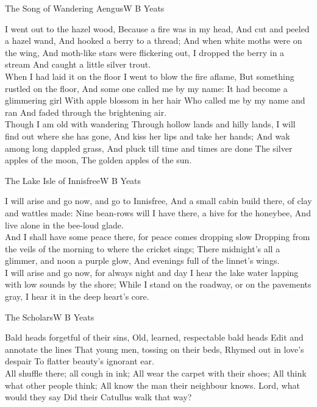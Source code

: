 \begin{poem}{The Song of Wandering Aengus}{W B Yeats}

I went out to the hazel wood, 
Because a fire was in my head, 
And cut and peeled a hazel wand, 
And hooked a berry to a thread; 
And when white moths were on the wing, 
And moth-like stars were flickering out, 
I dropped the berry in a stream 
And caught a little silver trout.\\

When I had laid it on the floor 
I went to blow the fire aflame, 
But something rustled on the floor, 
And some one called me by my name: 
It had become a glimmering girl 
With apple blossom in her hair 
Who called me by my name and ran 
And faded through the brightening air.\\

Though I am old with wandering 
Through hollow lands and hilly lands, 
I will find out where she has gone, 
And kiss her lips and take her hands; 
And wak among long dappled grass, 
And pluck till time and times are done 
The silver apples of the moon, 
The golden apples of the sun. \\
\end{poem}

 

\begin{poem}{The Lake Isle of Innisfree}{W B Yeats}

I will arise and go now, and go to Innisfree, 
And a small cabin build there, of clay and wattles made: 
Nine bean-rows will I have there, a hive for the honeybee, 
And live alone in the bee-loud glade. \\

And I shall have some peace there, for peace comes dropping slow 
Dropping from the veils of the morning to where the cricket sings; 
There midnight's all a glimmer, and noon a purple glow, 
And evenings full of the linnet's wings. \\

I will arise and go now, for always night and day 
I hear the lake water lapping with low sounds by the shore; 
While I stand on the roadway, or on the pavements gray, 
I hear it in the deep heart's core. \\
\end{poem}

 

\begin{poem}{The Scholars}{W B Yeats}

Bald heads forgetful of their sins,
Old, learned, respectable bald heads
Edit and annotate the lines
That young men, tossing on their beds,
Rhymed out in love's despair
To flatter beauty's ignorant ear.\\

All shuffle there; all cough in ink;
All wear the carpet with their shoes;
All think what other people think;
All know the man their neighbour knows.
Lord, what would they say
Did their Catullus walk that way?\\
\end{poem}

